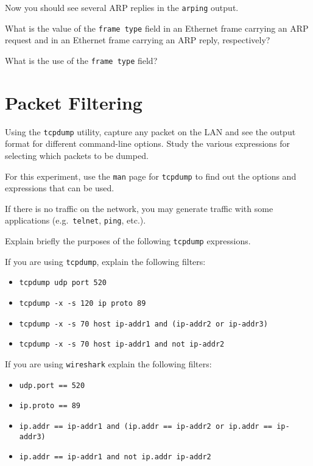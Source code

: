 \documentclass{../UTNetLab}
\begin{document}
    Now you should see several ARP replies in the \lstinline{arping} output.
    
    \begin{report}
        \item What is the value of the \texttt{frame type} field in an Ethernet frame carrying an ARP request and in an Ethernet frame carrying an ARP reply, respectively?

        \item What is the use of the \texttt{frame type} field?
    \end{report}

\section{Packet Filtering}
    Using the \lstinline{tcpdump} utility, capture any packet on the LAN and see the output format
    for different command-line options.
    Study the various expressions for selecting
    which packets to be dumped.

    For this experiment, use the \lstinline{man} page for \lstinline{tcpdump} to find out the options and
    expressions that can be used.

    If there is no traffic on the network, you may generate traffic with some applications
    (e.g.\ \lstinline{telnet}, \lstinline{ping}, etc.).
    
    \begin{report}
        \item Explain briefly the purposes of the following \lstinline{tcpdump} expressions.
    \end{report}

    If you are using \lstinline{tcpdump}, explain the following filters:
    \begin{itemize}
        \item \lstinline{tcpdump udp port 520}
        \item \lstinline{tcpdump -x -s 120 ip proto 89}
        \item \lstinline[emph={ip-addr1, ip-addr2, ip-addr3}]{tcpdump -x -s 70 host ip-addr1 and (ip-addr2 or ip-addr3)}
        \item \lstinline[emph={ip-addr1, ip-addr2}]{tcpdump -x -s 70 host ip-addr1 and not ip-addr2}
    \end{itemize}
    
    If you are using \lstinline{wireshark} explain the following filters:
    \begin{itemize}
        \item \lstinline[language=generic]{udp.port == 520}
        \item \lstinline[language=generic]{ip.proto == 89}
        \item \lstinline[emph={ip-addr1, ip-addr2, ip-addr3},language={generic}]{ip.addr == ip-addr1 and (ip.addr == ip-addr2 or ip.addr == ip-addr3)}
        \item \lstinline[emph={ip-addr1, ip-addr2},language={generic}]{ip.addr == ip-addr1 and not ip.addr ip-addr2}
    \end{itemize}
\end{document}
